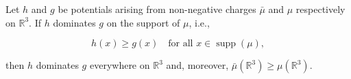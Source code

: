 Let $h$ and $g$ be potentials arising from non-negative charges $\bar{\mu}$ and $\mu$ respectively on $\mathbb{R}^3$. If $h$ dominates $g$ on the support of $\mu$, i.e.,

$$h(x) \geq g(x) \quad \text{for all } x \in \operatorname{supp}(\mu),$$

then $h$ dominates $g$ everywhere on $\mathbb{R}^3$ and, moreover, $\bar{\mu}(\mathbb{R}^3) \geq \mu(\mathbb{R}^3)$.

